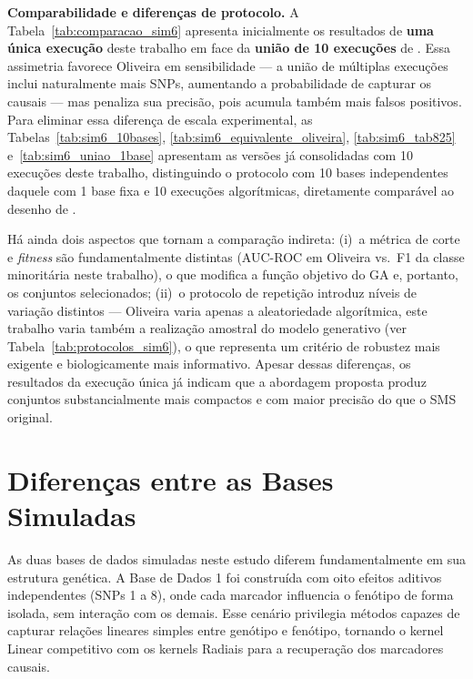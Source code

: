 \documentclass[
    12pt,
    a4paper,
    oneside,
    english,
    french,
    spanish,
    brazil
    ]{abntex2}
\newcommand{\novo}[1]{\textcolor{corNova}{#1}}
\begin{document}
\novo{\textbf{Comparabilidade e diferenças de protocolo.}
A Tabela~\ref{tab:comparacao_sim6} apresenta inicialmente os resultados de \textbf{uma única execução} deste trabalho em face da \textbf{união de 10 execuções} de \citeonline{Oliveira2015}. Essa assimetria favorece Oliveira em sensibilidade --- a união de múltiplas execuções inclui naturalmente mais SNPs, aumentando a probabilidade de capturar os causais --- mas penaliza sua precisão, pois acumula também mais falsos positivos. Para eliminar essa diferença de escala experimental, as Tabelas~\ref{tab:sim6_10bases}, \ref{tab:sim6_equivalente_oliveira}, \ref{tab:sim6_tab825} e~\ref{tab:sim6_uniao_1base} apresentam as versões já consolidadas com 10 execuções deste trabalho, distinguindo o protocolo com 10 bases independentes daquele com 1 base fixa e 10 execuções algorítmicas, diretamente comparável ao desenho de \citeonline{Oliveira2015}.}

\novo{Há ainda dois aspectos que tornam a comparação indireta: (i)~a métrica de corte e \textit{fitness} são fundamentalmente distintas (AUC-ROC em Oliveira vs.\ F1 da classe minoritária neste trabalho), o que modifica a função objetivo do GA e, portanto, os conjuntos selecionados; (ii)~o protocolo de repetição introduz níveis de variação distintos --- Oliveira varia apenas a aleatoriedade algorítmica, este trabalho varia também a realização amostral do modelo generativo (ver Tabela~\ref{tab:protocolos_sim6}), o que representa um critério de robustez mais exigente e biologicamente mais informativo. Apesar dessas diferenças, os resultados da execução única já indicam que a abordagem proposta produz conjuntos substancialmente mais compactos e com maior precisão do que o SMS original.}

\chapter{Diferenças entre as Bases Simuladas}

\novo{As duas bases de dados simuladas neste estudo diferem fundamentalmente em sua estrutura genética. A Base de Dados 1 foi construída com oito efeitos aditivos independentes (SNPs 1 a 8), onde cada marcador influencia o fenótipo de forma isolada, sem interação com os demais. Esse cenário privilegia métodos capazes de capturar relações lineares simples entre genótipo e fenótipo, tornando o kernel Linear competitivo com os kernels Radiais para a recuperação dos marcadores causais.}
\end{document}

